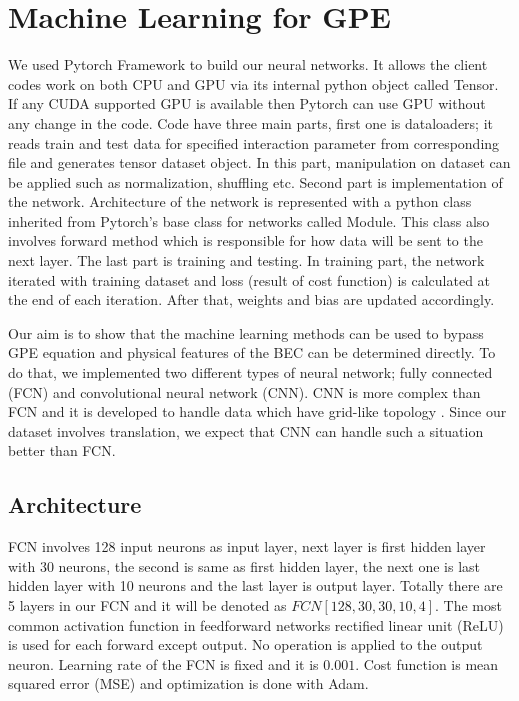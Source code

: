 \documentclass[a4paper,times,12pt]{article}
\begin{document}
\section{Machine Learning for GPE}

We used Pytorch Framework \cite{paszke2017automatic} to build our neural networks. It allows the client codes work on both CPU and GPU via its internal python object called Tensor. If any CUDA supported GPU is available then Pytorch can use GPU without any change in the code. Code have three main parts, first one is dataloaders; it reads train and test data for specified interaction parameter from corresponding file and generates tensor dataset object. In this part, manipulation on dataset can be applied such as normalization, shuffling etc. Second part is implementation of the network. Architecture of the network is represented with a python class inherited from Pytorch's base class for networks called Module. This class also involves forward method which is responsible for how data will be sent to the next layer. The last part is training and testing. In training part, the network iterated with training dataset and loss (result of cost function) is calculated at the end of each iteration. After that, weights and bias are updated accordingly. 

Our aim is to show that the machine learning methods can be used to bypass GPE equation and physical features of the BEC can be determined directly. To do that, we implemented two different types of neural network; fully connected (FCN) and convolutional neural network (CNN). CNN is more complex than FCN and it is developed to handle data which have grid-like topology \cite{goodfellow2016deep}. Since our dataset involves translation, we expect that CNN can handle such a situation better than FCN.


\subsection{Architecture}

FCN involves 128 input neurons as input layer, next layer is first hidden layer with 30 neurons, the second is same as first hidden layer, the next one is last hidden layer with 10 neurons and the last layer is output layer. Totally there are 5 layers in our FCN and it will be denoted as $FCN[128, 30, 30, 10, 4]$. The most common activation function in feedforward networks rectified linear unit (ReLU)\cite{mills2017deep} is used for each forward except output. No operation is applied to the output neuron. Learning rate of the FCN is fixed and it is $0.001$. Cost function is mean squared error (MSE) and optimization is done with Adam. 
\end{document}
